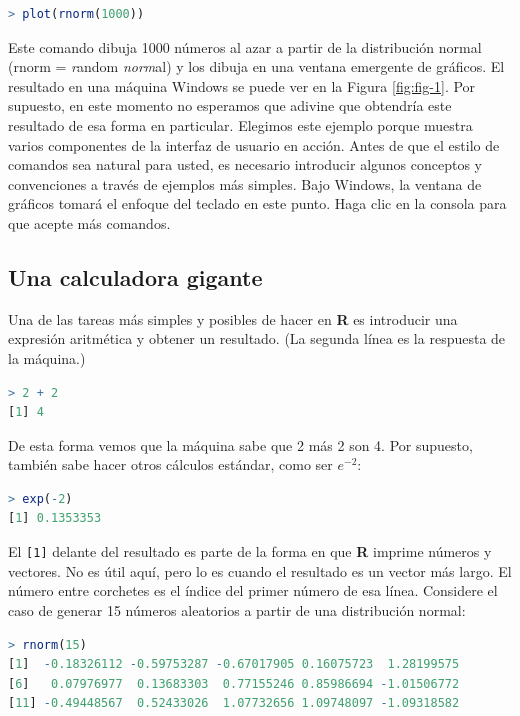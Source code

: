 \documentclass[spanish]{extbook}
\numberwithin{equation}{section}
\numberwithin{figure}{section}
\begin{document}
\begin{lstlisting}[language=R]
> plot(rnorm(1000))
\end{lstlisting}

Este comando dibuja 1000 números al azar a partir de la distribución normal
(rnorm = \emph{r}andom \emph{norm}al) y los dibuja en una ventana emergente de
gráficos. El resultado en una máquina Windows se puede ver en la Figura
\ref{fig:fig-1}.  Por supuesto, en este momento no esperamos que adivine que
obtendría este resultado de esa forma en particular. Elegimos este ejemplo
porque muestra varios componentes de la interfaz de usuario en acción. Antes de
que el estilo de comandos sea natural para usted, es necesario introducir
algunos conceptos y convenciones a través de ejemplos más simples. Bajo
Windows, la ventana de gráficos tomará el enfoque del teclado en este punto.
Haga clic en la consola para que acepte más comandos.

\subsection{Una calculadora gigante}

Una de las tareas más simples y posibles de hacer en \textbf{R} es introducir una
expresión aritmética y obtener un resultado. (La segunda línea es la respuesta
de la máquina.)

\begin{lstlisting}[language=R]
> 2 + 2 
[1] 4
\end{lstlisting}

De esta forma vemos que la máquina sabe que 2 más 2 son 4. Por supuesto,
también sabe hacer otros cálculos estándar, como ser $e^{-2}$:

\begin{lstlisting}[language=R]
> exp(-2) 
[1] 0.1353353
\end{lstlisting}

El \texttt{{[}1{]}} delante del resultado es parte de la forma en
que \textbf{R} imprime números
y vectores. No es útil aquí, pero lo es cuando el resultado es un
vector más largo. El número entre corchetes es el índice del primer
número de esa línea. Considere el caso de generar 15 números aleatorios
a partir de una distribución normal:

\begin{lstlisting}[language=R]
> rnorm(15) 
[1]  -0.18326112 -0.59753287 -0.67017905 0.16075723  1.28199575
[6]   0.07976977  0.13683303  0.77155246 0.85986694 -1.01506772
[11] -0.49448567  0.52433026  1.07732656 1.09748097 -1.09318582
\end{lstlisting}
\end{document}
